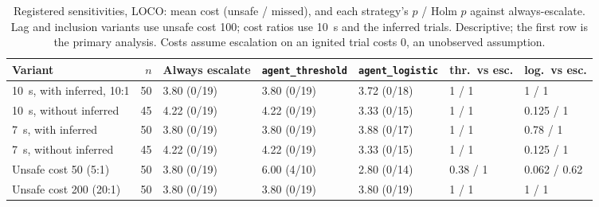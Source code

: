 \documentclass[11pt]{article}
\begin{document}
\begin{table}[t]
\centering\small
\caption{Registered sensitivities, LOCO: mean cost (unsafe / missed), and each strategy's $p$ / Holm $p$ against
always-escalate. Lag and inclusion variants use unsafe cost 100; cost ratios use 10~s and the inferred trials.
Descriptive; the first row is the primary analysis. Costs assume escalation on an ignited trial costs 0, an
unobserved assumption.}
\label{tab:sens}
\setlength{\tabcolsep}{2.5pt}
\begin{tabular}{@{}lrlllll@{}}
\toprule
Variant & $n$ & Always escalate & \texttt{agent\_threshold} & \texttt{agent\_logistic} & thr.\ vs esc. & log.\ vs esc. \\
\midrule
10~s, with inferred, 10:1 & 50 & 3.80 (0/19) & 3.80 (0/19) & 3.72 (0/18) & 1 / 1 & 1 / 1 \\
10~s, without inferred & 45 & 4.22 (0/19) & 4.22 (0/19) & 3.33 (0/15) & 1 / 1 & 0.125 / 1 \\
7~s, with inferred & 50 & 3.80 (0/19) & 3.80 (0/19) & 3.88 (0/17) & 1 / 1 & 0.78 / 1 \\
7~s, without inferred & 45 & 4.22 (0/19) & 4.22 (0/19) & 3.33 (0/15) & 1 / 1 & 0.125 / 1 \\
Unsafe cost 50 (5:1) & 50 & 3.80 (0/19) & 6.00 (4/10) & 2.80 (0/14) & 0.38 / 1 & 0.062 / 0.62 \\
Unsafe cost 200 (20:1) & 50 & 3.80 (0/19) & 3.80 (0/19) & 3.80 (0/19) & 1 / 1 & 1 / 1 \\
\bottomrule
\end{tabular}
\end{table}
\end{document}
